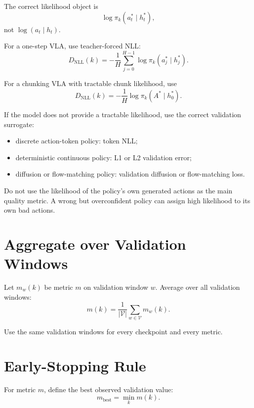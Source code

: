 \documentclass[11pt]{article}
\begin{document}
The correct likelihood object is
\begin{equation}
\log \pi_k(a^*_t\mid h^*_t),
\end{equation}
not $\log(a_t\mid h_t)$.

For a one-step VLA, use teacher-forced NLL:
\begin{equation}
D_{\mathrm{NLL}}(k)=-\frac{1}{H}\sum_{j=0}^{H-1}\log \pi_k(a^*_j\mid h^*_j).
\end{equation}

For a chunking VLA with tractable chunk likelihood, use
\begin{equation}
D_{\mathrm{NLL}}(k)=-\frac{1}{H}\log \pi_k(A^*\mid h^*_0).
\end{equation}

If the model does not provide a tractable likelihood, use the correct validation surrogate:
\begin{itemize}
    \item discrete action-token policy: token NLL;
    \item deterministic continuous policy: L1 or L2 validation error;
    \item diffusion or flow-matching policy: validation diffusion or flow-matching loss.
\end{itemize}

Do not use the likelihood of the policy's own generated actions as the main quality metric. A wrong but overconfident policy can assign high likelihood to its own bad actions.

\section{Aggregate over Validation Windows}

Let $m_w(k)$ be metric $m$ on validation window $w$. Average over all validation windows:
\begin{equation}
m(k)=\frac{1}{|\mathcal V|}\sum_{w\in\mathcal V}m_w(k).
\end{equation}

Use the same validation windows for every checkpoint and every metric.

\section{Early-Stopping Rule}

For metric $m$, define the best observed validation value:
\begin{equation}
m_{\mathrm{best}}=\min_k m(k).
\end{equation}
\end{document}
